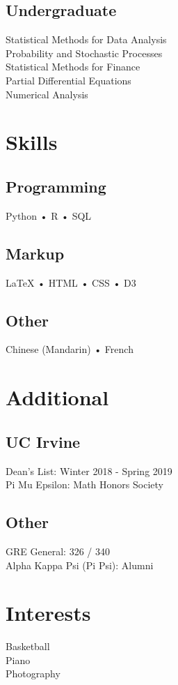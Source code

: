 \documentclass[]{deedy-resume-openfont}
\begin{document}
\begin{minipage}[t]{0.33\textwidth}
\subsection{Undergraduate} 
Statistical Methods for Data Analysis \\
Probability and Stochastic Processes \\
Statistical Methods for Finance \\
Partial Differential Equations \\
Numerical Analysis \\
\sectionsep


\section{Skills}
\subsection{Programming}
Python • R • SQL 
\subsection{Markup}
{\LaTeX} • HTML • CSS • D3
\subsection{Other}
Chinese (Mandarin) • French
\sectionsep


\section{Additional}
\subsection{UC Irvine}
Dean's List: Winter 2018 - Spring 2019 \\
Pi Mu Epsilon: Math Honors Society \\
\subsection{Other}
GRE General: 326 / 340 \\
Alpha Kappa Psi (Pi Psi): Alumni
\sectionsep

\section{Interests}
Basketball \\ Piano \\ Photography 
\sectionsep

%
%

\end{minipage} 
\end{document}
